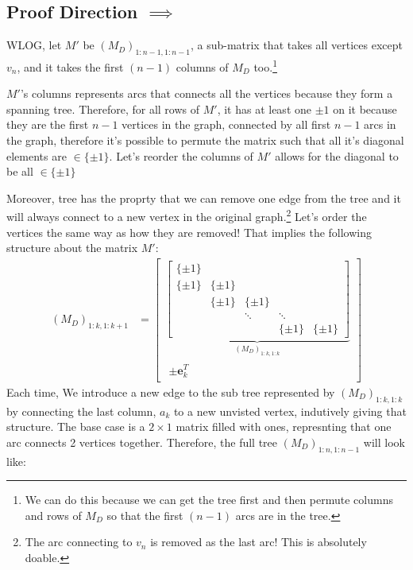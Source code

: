 \documentclass[]{article}
\theoremstyle{definition}
\begin{document}
    \subsection{Proof Direction $\implies$}
        WLOG, let $M'$ be $(M_D)_{1:n - 1, 1:n - 1}$, a sub-matrix that takes all vertices except $v_n$, and it takes the first $(n - 1)$ columns of $M_D$ too.\footnote{We can do this because we can get the tree first and then permute columns and rows of $M_D$ so that the first $(n - 1)$ arcs are in the tree. } 
        \par
        $M'$'s columns represents arcs that connects all the vertices because they form a spanning tree. Therefore, for all rows of $M'$, it has at least one $\pm 1$ on it because they are the first $n - 1$ vertices in the graph, connected by all first $n - 1$ arcs in the graph, therefore it's possible to permute the matrix such that all it's diagonal elements are $\in \{\pm 1\}$. Let's reorder the columns of $M'$ allows for the diagonal to be all $\in \{\pm 1\}$
        \par
        Moreover, tree has the proprty that we can remove one edge from the tree and it will always connect to a new vertex in the original graph.\footnote{The arc connecting to $v_n$ is removed as the last arc! This is absolutely doable.} Let's order the vertices the same way as how they are removed! That implies the following structure about the matrix $M'$: 
        \begin{align}
            (M_D)_{1:k, 1:k + 1}
            &= 
            \begin{bmatrix}
                \underbrace{\begin{bmatrix}
                    \{\pm 1\} &   & & \\
                    \{\pm 1\} & \{\pm 1\} & & \\
                      & \{\pm 1\} & \{\pm 1\} & \\
                      & & \ddots  &  \ddots\\
                      & & & \{\pm 1\} & \{\pm 1\}
                \end{bmatrix}}_{(M_D)_{1:k, 1:k}}
                \\
                \begin{matrix}
                    \pm \mathbf e_k^T 
                \end{matrix}
            \end{bmatrix}
        \end{align}
        Each time, We introduce a new edge to the sub tree represented by $(M_D)_{1:k, 1:k}$ by connecting the last column, $a_k$ to a new unvisted vertex, indutively giving that structure. The base case is a $2\times 1$ matrix filled with ones, represnting that one arc connects 2 vertices together. Therefore, the full tree $(M_D)_{1:n, 1:n - 1}$ will look like: 
\end{document}
